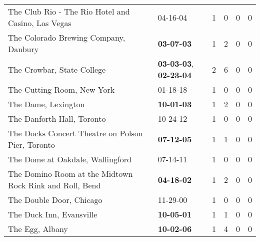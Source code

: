 \begin{longtable}{p{}p{}p{}p{}p{}p{}}
                           The Club Rio - The Rio Hotel and Casino, Las Vegas &                                                04-16-04\textsuperscript{} &  1 &  0 &  0 &  0 \\
                                        The Colorado Brewing Company, Danbury &                                       \textbf{03-07-03\textsuperscript{}} &  1 &  2 &  0 &  0 \\
                                                   The Crowbar, State College &  \textbf{03-03-03\textsuperscript{}}, \textbf{02-23-04\textsuperscript{}} &  2 &  6 &  0 &  0 \\
                                                   The Cutting Room, New York &                                                01-18-18\textsuperscript{} &  1 &  0 &  0 &  0 \\
                                                          The Dame, Lexington &                                       \textbf{10-01-03\textsuperscript{}} &  1 &  2 &  0 &  0 \\
                                                   The Danforth Hall, Toronto &                                                10-24-12\textsuperscript{} &  1 &  0 &  0 &  0 \\
                            The Docks Concert Theatre on Polson Pier, Toronto &                                       \textbf{07-12-05\textsuperscript{}} &  1 &  1 &  0 &  0 \\
                                             The Dome at Oakdale, Wallingford &                                                07-14-11\textsuperscript{} &  1 &  0 &  0 &  0 \\
                      The Domino Room at the Midtown Rock Rink and Roll, Bend &                                       \textbf{04-18-02\textsuperscript{}} &  1 &  2 &  0 &  0 \\
                                                     The Double Door, Chicago &                                                11-29-00\textsuperscript{} &  1 &  0 &  0 &  0 \\
                                                     The Duck Inn, Evansville &                                       \textbf{10-05-01\textsuperscript{}} &  1 &  1 &  0 &  0 \\
                                                              The Egg, Albany &                                       \textbf{10-02-06\textsuperscript{}} &  1 &  4 &  0 &  0 \\

\end{longtable}
